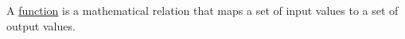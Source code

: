 \documentclass[preview]{standalone}
\begin{document}
\begin{center}
A \underline{function} is a mathematical relation that maps a set of input values to a set of output values.
\end{center}
\end{document}
